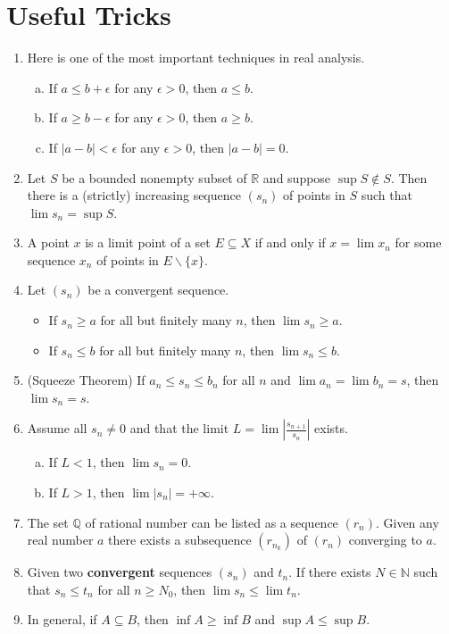 \documentclass[12pt, lettersize]{book}
\theoremstyle{plain}
\theoremstyle{definition}
\theoremstyle{remark}
\newcommand{\R}{\mathbb{R}}
\newcommand{\N}{\mathbb{N}}
\begin{document}
	\chapter{Useful Tricks}
	\begin{enumerate}
		\item Here is one of the most important techniques in real analysis.
		\begin{enumerate}[(a)]
			\item If $a\leq b+\epsilon$ for any $\epsilon>0$, then $a\leq b$.
			\item If $a\geq b-\epsilon$ for any $\epsilon>0$, then $a\geq b$.
			\item If $|a-b|<\epsilon$ for any $\epsilon>0$, then $|a-b|=0$.
		\end{enumerate}
		\item Let $S$ be a bounded nonempty subset of $\R$ and suppose $\sup S\notin S$. Then there is a (strictly) increasing sequence $(s_n)$ of points in $S$ such that $\lim s_n=\sup S$.
		\item A point $x$ is a limit point of a set $E\subseteq X$ if and only if $x=\lim x_n$ for some sequence $x_n$ of points in $E\backslash\{x\}$. 
		\item Let $(s_n)$ be a convergent sequence.
			\begin{itemize}
				\item If $s_n\geq a$ for all but finitely many $n$, then $\lim s_n\geq a$.
				\item If $s_n\leq b$ for all but finitely many $n$, then $\lim s_n\leq b$.
		\end{itemize}
		\item (Squeeze Theorem) If $a_n\leq s_n\leq b_n$ for all $n$ and $\lim a_n=\lim b_n=s$, then $\lim s_n=s$.
		\item Assume all $s_n\neq0$ and that the limit $L=\lim\left|\frac{s_{n+1}}{s_n}\right|$ exists.
		\begin{enumerate}[(a)]
			\item If $L<1$, then $\lim s_n=0$.
			\item If $L>1$, then $\lim |s_n|=+\infty$.
		\end{enumerate} 
		\item The set $\mathbb{Q}$ of rational number can be listed as a sequence $(r_n)$. Given any real number $a$ there exists a subsequence $(r_{n_k})$ of $(r_n)$ converging to $a$.
		\item Given two \textbf{convergent} sequences $(s_n)$ and $t_n$. If there exists $N\in\N$ such that $s_n\leq t_n$ for all $n\geq N_0$, then $\lim s_n\leq\lim t_n$.
		\item In general, if $A\subseteq B$, then $\inf A\geq \inf B$ and $\sup A\leq \sup B$.
  	\end{enumerate}
		
\end{document}
